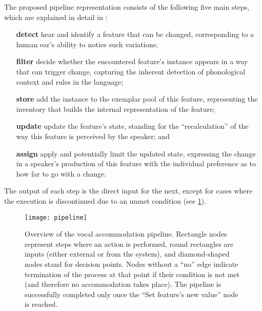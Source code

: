 The proposed pipeline representation consists of the following five main steps, which are explained in detail in :
%
\begin{itemize}[topsep=0cm, itemsep=-.1cm, wide=0cm, leftmargin=!, labelwidth=]
	\item[\textbf{detect}] hear and identify a feature that can be changed, corresponding to a human ear's ability to notice such variations;
	
	\item[\textbf{filter}] decide whether the encountered feature's instance appears in a way that can trigger change, capturing the inherent detection of phonological context and rules in the language;
	
	\item[\textbf{store}] add the instance to the exemplar pool of this feature, representing the inventory that builds the internal representation of the feature;
	
	\item[\textbf{update}] update the feature's state, standing for the \enquote{recalculation} of the way this feature is perceived by the speaker; and
	
	\item[\textbf{assign}] apply and potentially limit the updated state, expressing the change in a speaker's production of this feature with the individual preference as to how far to go with a change.
\end{itemize}
%
The output of each step is the direct input for the next, except for cases where the execution is discontinued due to an unmet condition (see \cref{fig:adaptation_module_pipeline}).
%
\begin{figure}[t]
	\centering
	\texttt{[image: pipeline]}
	\caption[Phonetic convergence algorithm pipeline]
		{Overview of the vocal accommodation pipeline.
		Rectangle nodes represent steps where an action is performed, round rectangles are inputs (either external or from the system), and diamond-shaped nodes stand for decision points.
		Nodes without a \enquote{no} edge indicate termination of the process at that point if their condition is not met (and therefore no accommodation takes place).
		The pipeline is successfully completed only once the \enquote{Set feature's new value} node is reached.}
	\label{fig:adaptation_module_pipeline}
\end{figure}

